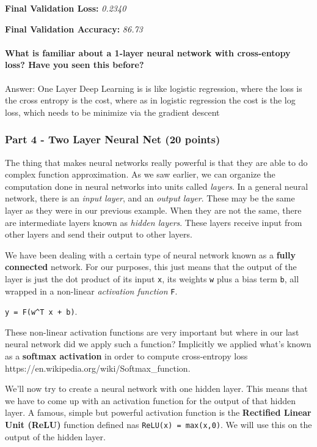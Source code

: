 \documentclass[11pt]{article}
\begin{document}
    \textbf{Final Validation Loss:} \emph{0.2340}

\textbf{Final Validation Accuracy:} \emph{86.73}

    \paragraph{What is familiar about a 1-layer neural network with
cross-entopy loss? Have you seen this
before?}\label{what-is-familiar-about-a-1-layer-neural-network-with-cross-entopy-loss-have-you-seen-this-before}

    Answer: One Layer Deep Learning is is like logistic regression, where
the loss is the cross entropy is the cost, where as in logistic
regression the cost is the log loss, which needs to be minimize via the
gradient descent

    \subsubsection{Part 4 - Two Layer Neural Net (20
points)}\label{part-4---two-layer-neural-net-20-points}

The thing that makes neural networks really powerful is that they are
able to do complex function approximation. As we saw earlier, we can
organize the computation done in neural networks into units called
\emph{layers}. In a general neural network, there is an \emph{input
layer}, and an \emph{output layer}. These may be the same layer as they
were in our previous example. When they are not the same, there are
intermediate layers known as \emph{hidden layers}. These layers receive
input from other layers and send their output to other layers.

We have been dealing with a certain type of neural network known as a
\textbf{fully connected} network. For our purposes, this just means that
the output of the layer is just the dot product of its input \texttt{x},
its weights \texttt{w} plus a bias term \texttt{b}, all wrapped in a
non-linear \emph{activation function} \texttt{F}.

\texttt{y\ =\ F(w\^{}T\ x\ +\ b)}.

These non-linear activation functions are very important but where in
our last neural network did we apply such a function? Implicitly we
applied what's known as a \textbf{softmax activation} in order to
compute cross-entropy loss
https://en.wikipedia.org/wiki/Softmax\_function.

We'll now try to create a neural network with one hidden layer. This
means that we have to come up with an activation function for the output
of that hidden layer. A famous, simple but powerful activation function
is the \textbf{Rectified Linear Unit (ReLU)} function defined nas
\texttt{ReLU(x)\ =\ max(x,0)}. We will use this on the output of the
hidden layer.
\end{document}
